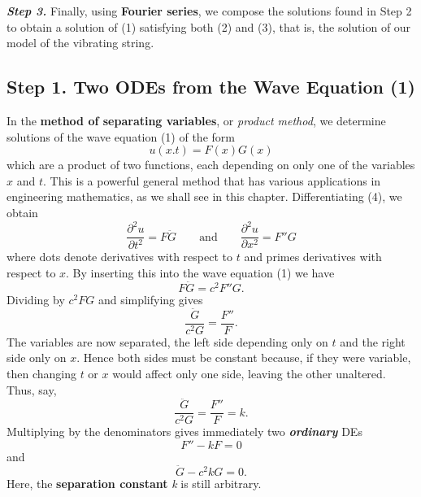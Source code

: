 \documentclass[12pt, leqno, oneside]{amsart}
\begin{document}
\emph{\textbf{Step 3.}} Finally, using \textbf{Fourier series}, we compose the solutions found in Step 2 to obtain
a solution of (1) satisfying both (2) and (3), that is, the solution of our model of the
vibrating string.

\subsection{Step 1. Two ODEs from the Wave Equation (1)}

In the \textbf{method of separating variables}, or \emph{product method}, we determine 
solutions of the wave equation (1) of the form
\begin{equation}
    u(x.t) = F(x)G(x)
\end{equation}
which are a product of two functions, each depending on only one of the
variables $x$ and $t$.
This is a powerful general method that has various applications in engineering mathematics,
as we shall see in this chapter. Differentiating (4), we obtain
\begin{equation}
  \nonumber
    \frac{ \partial^2{u} }{ \partial{t^2} } = F\ddot{G} \qquad \text{and}
    \qquad \frac{ \partial^2{u} }{ \partial{x^2} } = F''G
\end{equation}
where dots denote derivatives with respect to $t$ and primes derivatives with
respect to $x$. By inserting this into the wave equation (1) we have
\begin{equation}
  \nonumber
    F\ddot{G} = c^2F''G.
\end{equation}
Dividing by $c^2FG$ and simplifying gives
\begin{equation}
  \nonumber
    \frac{\ddot{G}}{c^2G} = \frac{F''}{F}.
\end{equation}
The variables are now separated, the left side depending only on $t$ and the right side 
only on $x$. Hence both sides must be constant because, if they were variable, then
changing $t$ or $x$ would affect only one side, leaving the other unaltered. Thus, say,
\begin{equation}
  \nonumber
    \frac{\ddot{G}}{c^2G} = \frac{F''}{F} = k.
\end{equation}
Multiplying by the denominators gives immediately two \emph{\textbf{ordinary}} DEs
\begin{equation}
    F'' - kF = 0
\end{equation}
and
\begin{equation}
    \ddot{G} - c^2kG = 0.
\end{equation}
Here, the \textbf{separation constant} \emph{k} is still arbitrary.
\end{document}
